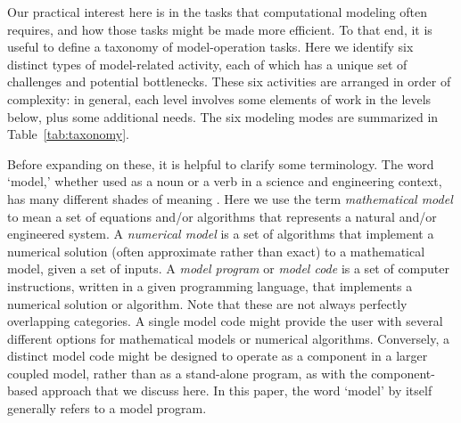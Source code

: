 \documentclass[12pt]{amsart}
\begin{document}
Our practical interest here is in the tasks that computational modeling often requires, and how those tasks might be made more efficient. To that end, it is useful to define a taxonomy of model-operation tasks. Here we identify six distinct types of model-related activity, each of which has a unique set of challenges and potential bottlenecks. These six activities are arranged in order of complexity: in general, each level involves some elements of work in the levels below, plus some additional needs. The six modeling modes are summarized in Table~\ref{tab:taxonomy}.

Before expanding on these, it is helpful to clarify some terminology. The word `model,' whether used as a noun or a verb in a science and engineering context, has many different shades of meaning \citep[e.g.,][]{bras2003six}. Here we use the term \textit{mathematical model} to mean a set of equations and/or algorithms that represents a natural and/or engineered system. A \textit{numerical model} is a set of algorithms that implement a numerical solution (often approximate rather than exact) to a mathematical model, given a set of inputs. A \textit{model program} or \textit{model code} is a set of computer instructions, written in a given programming language, that implements a numerical solution or algorithm. Note that these are not always perfectly overlapping categories. A single model code might provide the user with several different options for mathematical models or numerical algorithms. Conversely, a distinct model code might be designed to operate as a component in a larger coupled model, rather than as a stand-alone program, as with the component-based approach that we discuss here. In this paper, the word `model' by itself generally refers to a model program.
\end{document}
